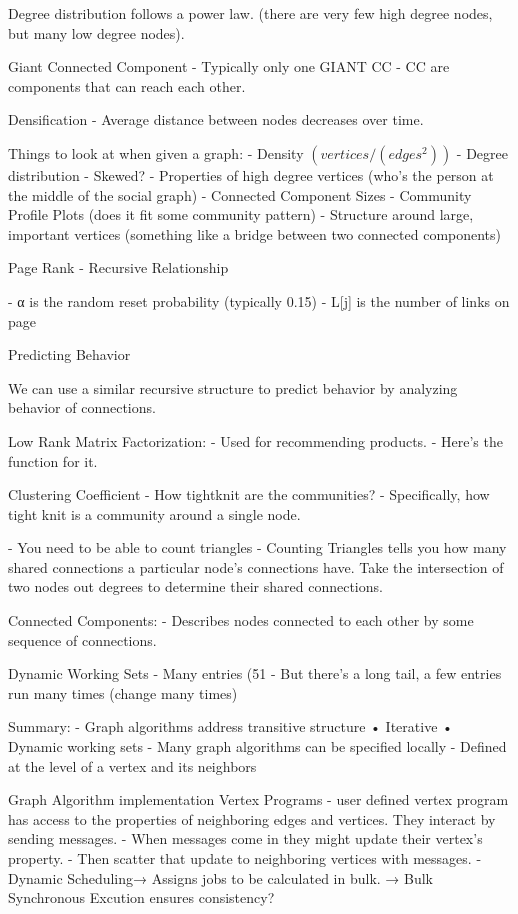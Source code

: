 \documentclass[3pt,landscape]{article}
\begin{document}
\begin{multicols}{3}
Degree distribution follows a power law. (there are very few high degree nodes, but many low degree nodes). 

Giant Connected Component 
- Typically only one GIANT CC
    - CC are components that can reach each other. 

Densification - Average distance between nodes decreases over time. 

Things to look at when given a graph:
- Density $(vertices / (edges ^ 2))$
- Degree distribution
  - Skewed?
  - Properties of high degree vertices (who's the person at the middle of the social graph)
- Connected Component Sizes
- Community Profile Plots (does it fit some community pattern)
- Structure around large, important vertices (something like a bridge between two connected components)

Page Rank
- Recursive Relationship

- α is the random reset probability (typically 0.15)
- L[j] is the number of links on page 

Predicting Behavior

We can use a similar recursive structure to predict behavior by analyzing behavior of connections.

Low Rank Matrix Factorization:
- Used for recommending products.
- Here’s the function for it. 

Clustering Coefficient 
- How tightknit are the communities?
- Specifically, how tight knit is a community around a single node.


- You need to be able to count triangles
  - Counting Triangles tells you how many shared connections a particular node’s connections  have. Take the intersection of two nodes out degrees to determine their shared connections. 

Connected Components:
- Describes nodes connected to each other by some sequence of connections. 

Dynamic Working Sets
- Many entries (51%
- But there’s a long tail, a few entries run many times (change many times)

Summary:
- Graph algorithms address transitive structure 
  • Iterative 
  • Dynamic working sets 
- Many graph algorithms can be specified locally 
  - Defined at the level of a vertex and its neighbors

Graph Algorithm implementation
Vertex Programs
- user defined vertex program has access to the properties of neighboring edges and vertices. They interact by sending messages.
- When messages come in they might update their vertex’s property. 
- Then scatter that update to neighboring vertices with messages. 
- Dynamic Scheduling→ Assigns jobs to be calculated in bulk. → Bulk Synchronous Excution ensures consistency?



\end{multicols}
\end{document}
